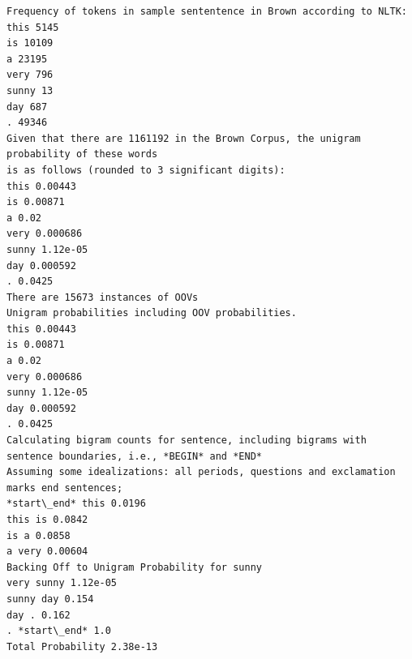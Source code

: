 \documentclass[11pt]{article}
\begin{document}
    \begin{Verbatim}[commandchars=\\\{\}]
Frequency of tokens in sample sententence in Brown according to NLTK:
this 5145
is 10109
a 23195
very 796
sunny 13
day 687
. 49346
Given that there are 1161192 in the Brown Corpus, the unigram probability of these words
is as follows (rounded to 3 significant digits):
this 0.00443
is 0.00871
a 0.02
very 0.000686
sunny 1.12e-05
day 0.000592
. 0.0425
There are 15673 instances of OOVs
Unigram probabilities including OOV probabilities.
this 0.00443
is 0.00871
a 0.02
very 0.000686
sunny 1.12e-05
day 0.000592
. 0.0425
Calculating bigram counts for sentence, including bigrams with sentence boundaries, i.e., *BEGIN* and *END*
Assuming some idealizations: all periods, questions and exclamation marks end sentences;
*start\_end* this 0.0196
this is 0.0842
is a 0.0858
a very 0.00604
Backing Off to Unigram Probability for sunny
very sunny 1.12e-05
sunny day 0.154
day . 0.162
. *start\_end* 1.0
Total Probability 2.38e-13

    \end{Verbatim}
\end{document}
